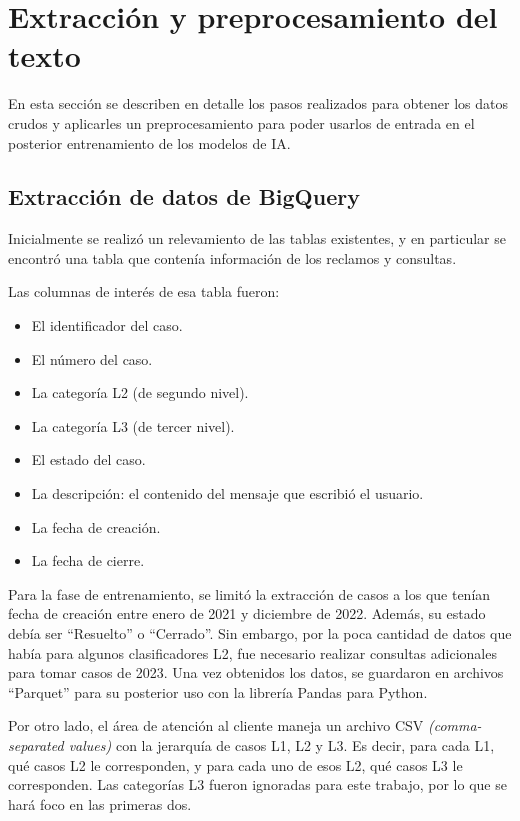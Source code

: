 \section{Extracción y preprocesamiento del texto}

En esta sección se describen en detalle los pasos realizados para obtener los datos crudos y aplicarles un preprocesamiento para poder usarlos de entrada en el posterior entrenamiento de los modelos de IA.

\subsection{Extracción de datos de BigQuery}

Inicialmente se realizó un relevamiento de las tablas existentes, y en particular se encontró una tabla que contenía información de los reclamos y consultas. 

Las columnas de interés de esa tabla fueron:
\begin{itemize}
	\item El identificador del caso.
	\item El número del caso.
	\item La categoría L2 (de segundo nivel).
	\item La categoría L3 (de tercer nivel).
	\item El estado del caso.
	\item La descripción: el contenido del mensaje que escribió el usuario.
	\item La fecha de creación.
	\item La fecha de cierre.
\end{itemize}

Para la fase de entrenamiento, se limitó la extracción de casos a los que tenían fecha de creación entre enero de 2021 y diciembre de 2022. Además, su estado debía ser ``Resuelto'' o ``Cerrado''. Sin embargo, por la poca cantidad de datos que había para algunos clasificadores L2, fue necesario realizar consultas adicionales para tomar casos de 2023. Una vez obtenidos los datos, se guardaron en archivos ``Parquet'' para su posterior uso con la librería Pandas para Python.

Por otro lado, el área de atención al cliente maneja un archivo CSV \textit{(comma-separated values)} con la jerarquía de casos L1, L2 y L3. Es decir, para cada L1, qué casos L2 le corresponden, y para cada uno de esos L2, qué casos L3 le corresponden. Las categorías L3 fueron ignoradas para este trabajo, por lo que se hará foco en las primeras dos.

